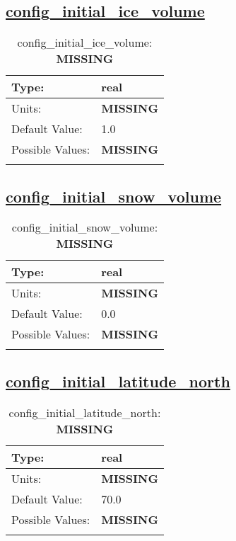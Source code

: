 \subsection[config\_initial\_ice\_volume]{\hyperref[sec:nm_tab_initialize]{config\_initial\_ice\_volume}}
\label{subsec:nm_sec_config_initial_ice_volume}
\begin{center}
\begin{longtable}{| p{2.0in} || p{4.0in} |}
    \hline
    Type: & real \\
    \hline
    Units: & {\bf \color{red} MISSING} \\
    \hline
    Default Value: & 1.0 \\
    \hline
    Possible Values: & {\bf \color{red} MISSING} \\
    \hline
    \caption{config\_initial\_ice\_volume: {\bf \color{red} MISSING}}
\end{longtable}
\end{center}
\subsection[config\_initial\_snow\_volume]{\hyperref[sec:nm_tab_initialize]{config\_initial\_snow\_volume}}
\label{subsec:nm_sec_config_initial_snow_volume}
\begin{center}
\begin{longtable}{| p{2.0in} || p{4.0in} |}
    \hline
    Type: & real \\
    \hline
    Units: & {\bf \color{red} MISSING} \\
    \hline
    Default Value: & 0.0 \\
    \hline
    Possible Values: & {\bf \color{red} MISSING} \\
    \hline
    \caption{config\_initial\_snow\_volume: {\bf \color{red} MISSING}}
\end{longtable}
\end{center}
\subsection[config\_initial\_latitude\_north]{\hyperref[sec:nm_tab_initialize]{config\_initial\_latitude\_north}}
\label{subsec:nm_sec_config_initial_latitude_north}
\begin{center}
\begin{longtable}{| p{2.0in} || p{4.0in} |}
    \hline
    Type: & real \\
    \hline
    Units: & {\bf \color{red} MISSING} \\
    \hline
    Default Value: & 70.0 \\
    \hline
    Possible Values: & {\bf \color{red} MISSING} \\
    \hline
    \caption{config\_initial\_latitude\_north: {\bf \color{red} MISSING}}
\end{longtable}
\end{center}
